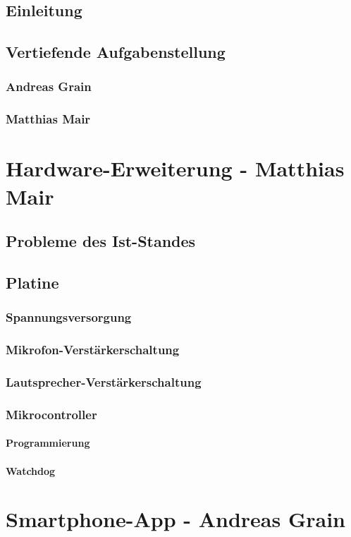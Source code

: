 \documentclass[a4paper, 12pt, twoside, openright
]{memoir}
\begin{document}
\mainmatter
\chapter{Einleitung}

\chapter{Vertiefende Aufgabenstellung}
\section{Andreas Grain}
\section{Matthias Mair}

\part{Hardware-Erweiterung - Matthias Mair}
\chapter{Probleme des Ist-Standes}
\chapter{Platine}
\section{Spannungsversorgung}
\section{Mikrofon-Verstärkerschaltung}
\section{Lautsprecher-Verstärkerschaltung}
\section{Mikrocontroller}
\subsection{Programmierung}
\subsection{Watchdog}

\part{Smartphone-App - Andreas Grain}
\end{document}
